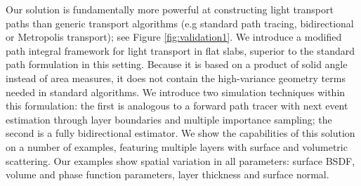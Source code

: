 Our solution is fundamentally more powerful at constructing light transport paths than generic transport algorithms (e.g standard path tracing, bidirectional or Metropolis transport); see Figure \ref{fig:validation1}. We introduce a modified path integral framework for light transport in flat slabs, superior to the standard path formulation in this setting. Because it is based on a product of solid angle instead of area measures, it does not contain the high-variance geometry terms needed in standard algorithms. We introduce two simulation techniques within this formulation: the first is analogous to a forward path tracer with next event estimation through layer boundaries and multiple importance sampling; the second is a fully bidirectional estimator. We show the capabilities of this solution on a number of examples, featuring multiple layers with surface and volumetric scattering. Our examples show spatial variation in all parameters: surface BSDF, volume and phase function parameters, layer thickness and surface normal.

